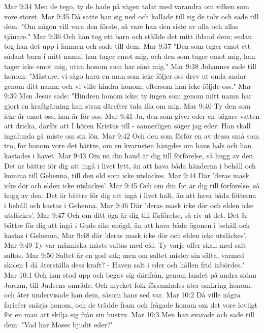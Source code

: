 Mar 9:34  Men de tego, ty de hade på vägen talat med varandra om vilken som vore störst.
Mar 9:35  Då satte han sig ned och kallade till sig de tolv och sade till dem: "Om någon vill vara den förste, så vare han den siste av alla och allas tjänare."
Mar 9:36  Och han tog ett barn och ställde det mitt ibland dem; sedan tog han det upp i famnen och sade till dem:
Mar 9:37  "Den som tager emot ett sådant barn i mitt namn, han tager emot mig, och den som tager emot mig, han tager icke emot mig, utan honom som har sänt mig."
Mar 9:38  Johannes sade till honom: "Mästare, vi sågo huru en man som icke följer oss drev ut onda andar genom ditt namn; och vi ville hindra honom, eftersom han icke följde oss."
Mar 9:39  Men Jesus sade: "Hindren honom icke; ty ingen som genom mitt namn har gjort en kraftgärning kan strax därefter tala illa om mig.
Mar 9:40  Ty den som icke är emot oss, han är för oss.
Mar 9:41  Ja, den som giver eder en bägare vatten att dricka, därför att I hören Kristus till - sannerligen säger jag eder: Han skall ingalunda gå miste om sin lön.
Mar 9:42  Och den som förför en av dessa små som tro, för honom vore det bättre, om en kvarnsten hängdes om hans hals och han kastades i havet.
Mar 9:43  Om nu din hand är dig till förförelse, så hugg av den. Det är bättre för dig att ingå i livet lytt, än att hava båda händerna i behåll och komma till Gehenna, till den eld som icke utsläckes.
Mar 9:44  Där 'deras mask icke dör och elden icke utsläckes'.
Mar 9:45  Och om din fot är dig till förförelse, så hugg av den. Det är bättre för dig att ingå i livet halt, än att hava båda fötterna i behåll och kastas i Gehenna.
Mar 9:46  Där 'deras mask icke dör och elden icke utsläckes'.
Mar 9:47  Och om ditt öga är dig till förförelse, så riv ut det. Det är bättre för dig att ingå i Guds rike enögd, än att hava båda ögonen i behåll och kastas i Gehenna,
Mar 9:48  där 'deras mask icke dör och elden icke utsläckes'.
Mar 9:49  Ty var människa måste saltas med eld. Ty varje offer skall med salt saltas.
Mar 9:50  Saltet är en god sak; men om saltet mister sin sälta, varmed skolen I då återställa dess kraft? - Haven salt i eder och hållen frid inbördes."
Mar 10:1  Och han stod upp och begav sig därifrån, genom landet på andra sidan Jordan, till Judeens område. Och mycket folk församlades åter omkring honom, och åter undervisade han dem, såsom hans sed var.
Mar 10:2  Då ville några fariséer snärja honom, och de trädde fram och frågade honom om det vore lovligt för en man att skilja sig från sin hustru.
Mar 10:3  Men han svarade och sade till dem: "Vad har Moses bjudit eder?"
